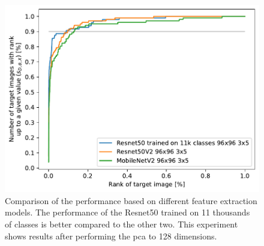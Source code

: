 \begin{figure}
    \centering
    \includegraphics[width=0.8\linewidth]{graphs/2536f6c96149dea24dae84dbf52f760d7d58b0dffa7d660656e1784d9dca277f.pdf}
    \caption[Comparison of the performance based on different feature extraction models]{Comparison of the performance based on different feature extraction models. The performance of the Resnet50 trained on 11 thousands of classes is better compared to the other two. This experiment shows results after performing the \acrshort{pca} to 128 dimensions.}
    \label{fig:networks}
\end{figure}
